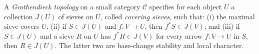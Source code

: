 
A \emph{Grothendieck topology} on a small category $\mathcal C$ specifies for each object $U$ a collection $J(U)$ of sieves on $U$, called \emph{covering sieves}, such that: (i) the maximal sieve covers $U$; (ii) if $S\in J(U)$ and $f:V\to U$, then $f^*S\in J(V)$; and (iii) if $S\in J(U)$ and a sieve $R$ on $U$ has $f^*R\in J(V)$ for every arrow $f:V\to U$ in $S$, then $R\in J(U)$. The latter two are base-change stability and local character.
